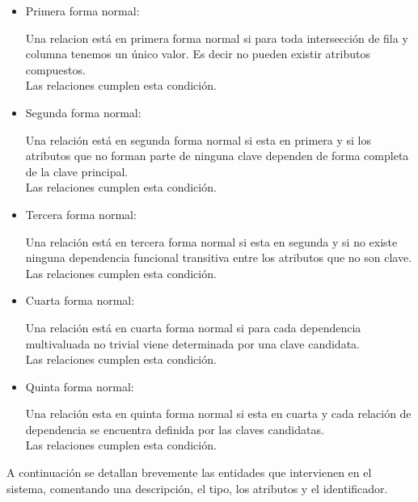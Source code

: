 \begin{itemize}
\item Primera forma normal:

Una relacion está en primera forma normal si para toda intersección de fila y columna tenemos un único valor. Es decir no pueden existir atributos compuestos.\\Las relaciones cumplen esta condición.

\item Segunda forma normal:

Una relación está en segunda forma normal si esta en primera y si los atributos que no forman parte de ninguna clave dependen de forma completa de la clave principal.\\Las relaciones cumplen esta condición.

\item Tercera forma normal:

Una relación está en tercera forma normal si esta en segunda y si no existe ninguna dependencia funcional transitiva entre los atributos que no son clave.\\Las relaciones cumplen esta condición.

\item Cuarta forma normal:

Una relación está en cuarta forma normal si para cada dependencia multivaluada no trivial viene determinada por una clave candidata.\\Las relaciones cumplen esta condición.

\item Quinta forma normal:

Una relación esta en quinta forma normal si esta en cuarta y cada relación de dependencia se encuentra definida por las claves candidatas.\\Las relaciones cumplen esta condición.
\end{itemize}


A continuación se detallan brevemente las entidades que intervienen en el sistema, comentando una descripción, el tipo, los atributos y el identificador.

